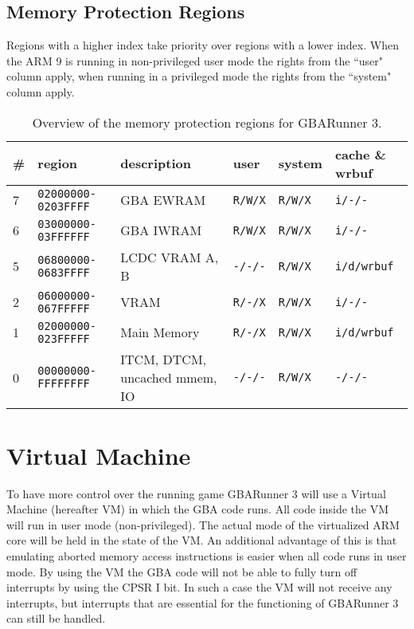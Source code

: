 \documentclass[a4paper,10pt]{report}
\begin{document}
	\section{Memory Protection Regions}
		Regions with a higher index take priority over regions with a lower index. When the ARM 9 is running in non-privileged user mode the rights from the ``user" column apply, when running in a privileged mode the rights from the ``system" column apply.
		\begin{table}[htb]
			\centering
			\begin{tabular}{l|l|l|l|l|l}
				\# & region & description & user & system & cache \& wrbuf \\ \hline
				7 & \texttt{02000000-0203FFFF} & GBA EWRAM & \texttt{R/W/X} & \texttt{R/W/X} & \texttt{i/-/-} \\
				6 & \texttt{03000000-03FFFFFF} & GBA IWRAM & \texttt{R/W/X} & \texttt{R/W/X} & \texttt{i/-/-} \\
				5 & \texttt{06800000-0683FFFF} & LCDC VRAM A, B & \texttt{-/-/-} & \texttt{R/W/X} & \texttt{i/d/wrbuf} \\
				2 & \texttt{06000000-067FFFFF} & VRAM & \texttt{R/-/X} & \texttt{R/W/X} & \texttt{i/-/-} \\
				1 & \texttt{02000000-023FFFFF} & Main Memory & \texttt{R/-/X} & \texttt{R/W/X} & \texttt{i/d/wrbuf} \\
				0 & \texttt{00000000-FFFFFFFF} & ITCM, DTCM, uncached mmem, IO & \texttt{-/-/-} & \texttt{R/W/X} & \texttt{-/-/-}
			\end{tabular}
			\caption{Overview of the memory protection regions for GBARunner 3.}			
		\end{table}
	
\chapter{Virtual Machine}\label{chap_vm}
	To have more control over the running game GBARunner 3 will use a Virtual Machine (hereafter VM) in which the GBA code runs. All code inside the VM will run in user mode (non-privileged). The actual mode of the virtualized ARM core will be held in the state of the VM. An additional advantage of this is that emulating aborted memory access instructions is easier when all code runs in user mode. By using the VM the GBA code will not be able to fully turn off interrupts by using the CPSR I bit. In such a case the VM will not receive any interrupts, but interrupts that are essential for the functioning of GBARunner 3 can still be handled.
	
\end{document}
